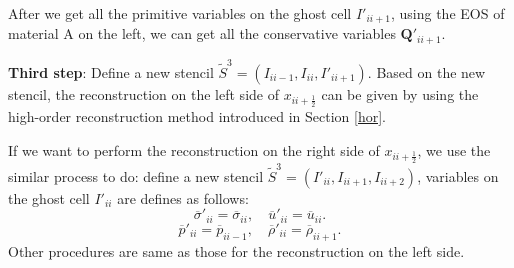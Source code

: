 \documentclass[review]{elsarticle}
\begin{document}
After we get all the primitive variables on  the ghost cell $I'_{ii+1}$, using the EOS of material A on the left, we can get all the conservative variables  $\mathbf{Q}'_{ii+1}$.

\textbf{Third  step}: Define a new stencil $\widetilde{S}^3=(I_{ii-1},I_{ii}, I'_{ii+1})$. Based on the new stencil, the reconstruction on the left side of $x_{ii+\frac{1}{2}}$  can be given by using the high-order reconstruction method introduced in  Section \ref{hor}.


If we want to perform the reconstruction on the right side of $x_{ii+\frac{1}{2}}$, we use the similar process to do: define a new stencil $\widetilde{S}^3=(I'_{ii},I_{ii+1}, I_{ii+2})$, variables on the  ghost cell $I'_{ii}$ are defines as follows:
\begin{equation*}
  \overline{\sigma}'_{ii} = \overline{\sigma}_{ii}, \quad \overline{u}'_{ii} = \overline{u}_{ii}.
\end{equation*}
\begin{equation*}
\overline{p}'_{ii} = \overline{p}_{ii-1}, \quad \overline{\rho}'_{ii} = \overline{\rho}_{ii+1}.
\end{equation*}
Other procedures are same as those for the reconstruction on the left side.
\end{document}
